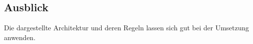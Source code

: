 \subsection{Ausblick}
    Die dargestellte Architektur und deren Regeln lassen sich gut bei der Umsetzung anwenden.